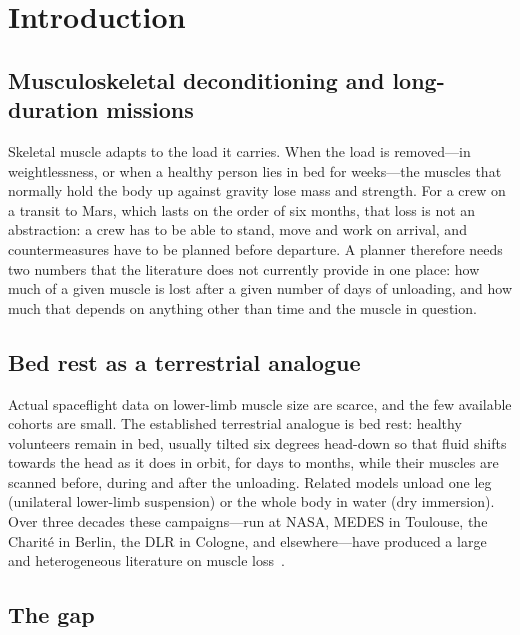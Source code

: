 \section{Introduction}
\label{sec:introduction}

\subsection{Musculoskeletal deconditioning and long-duration missions}

Skeletal muscle adapts to the load it carries. When the load is removed---in weightlessness, or when a healthy
person lies in bed for weeks---the muscles that normally hold the body up against gravity lose mass and strength.
For a crew on a transit to Mars, which lasts on the order of six months, that loss is not an abstraction: a crew
has to be able to stand, move and work on arrival, and countermeasures have to be planned before departure. A
planner therefore needs two numbers that the literature does not currently provide in one place: how much of a
given muscle is lost after a given number of days of unloading, and how much that depends on anything other than
time and the muscle in question.

\subsection{Bed rest as a terrestrial analogue}

Actual spaceflight data on lower-limb muscle size are scarce, and the few available cohorts are small. The
established terrestrial analogue is bed rest: healthy volunteers remain in bed, usually tilted six degrees
head-down so that fluid shifts towards the head as it does in orbit, for days to months, while their muscles are
scanned before, during and after the unloading. Related models unload one leg (unilateral lower-limb suspension)
or the whole body in water (dry immersion). Over three decades these campaigns---run at NASA, MEDES in Toulouse,
the Charit\'e in Berlin, the DLR in Cologne, and elsewhere---have produced a large and heterogeneous literature
on muscle loss~\citep{leblanc1992,alkner2004,belavy2009,miokovic2012,trappe2007,trappe2024sprint,dulac2024}.

\subsection{The gap}

